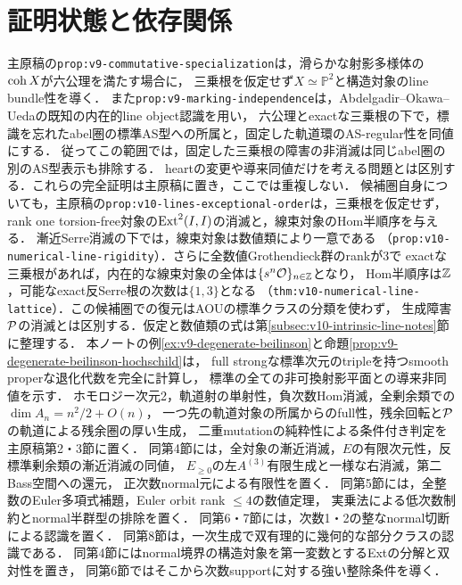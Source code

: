 \documentclass[11pt,a4paper]{ltjsarticle}
\begin{document}
\section{証明状態と依存関係}
\begin{description}[style=nextline]
\item[原稿に証明を収めた直接の結果]
主原稿の\texttt{prop:v9-commutative-specialization}は，滑らかな射影多様体の$\operatorname{coh} X$が六公理を満たす場合に，
三乗根を仮定せず$X\simeq\mathbb P^2$と構造対象のline bundle性を導く．
また\texttt{prop:v9-marking-independence}は，Abdelgadir--Okawa--Uedaの既知の内在的line object認識を用い，
六公理とexactな三乗根の下で，標識を忘れたabel圏の標準AS型への所属と，固定した軌道環のAS-regular性を同値にする．
従ってこの範囲では，固定した三乗根の障害の非消滅は同じabel圏の別のAS型表示も排除する．
heartの変更や導来同値だけを考える問題とは区別する．これらの完全証明は主原稿に置き，ここでは重複しない．
候補圏自身についても，主原稿の\texttt{prop:v10-lines-exceptional-order}は，三乗根を仮定せず，
rank one torsion-free対象の$\operatorname{Ext}^2(I,I)$の消滅と，線束対象のHom半順序を与える．
漸近Serre消滅の下では，線束対象は数値類により一意である
（\texttt{prop:v10-numerical-line-rigidity}）．さらに全数値Grothendieck群のrankが3で
exactな三乗根があれば，内在的な線束対象の全体は$\{s^n\mathcal O\}_{n\in\mathbb Z}$となり，
Hom半順序は$\mathbb Z$，可能なexact反Serre根の次数は$\{1,3\}$となる
（\texttt{thm:v10-numerical-line-lattice}）．この候補圏での復元はAOUの標準クラスの分類を使わず，
生成障害$\mathcal P$の消滅とは区別する．仮定と数値類の式は第\ref{subsec:v10-intrinsic-line-notes}節に整理する．
本ノートの例\ref{ex:v9-degenerate-beilinson}と命題\ref{prop:v9-degenerate-beilinson-hochschild}は，
full strongな標準次元のtripleを持つsmooth properな退化代数を完全に計算し，
標準の全ての非可換射影平面との導来非同値を示す．
ホモロジー次元2，軌道射の単射性，負次数Hom消滅，全剰余類での$\dim A_n=n^2/2+O(n)$，
一つ先の軌道対象の所属からのfull性，残余回転と$\mathcal P$の軌道による残余圏の厚い生成，
二重mutationの純粋性による条件付き判定を主原稿第2・3節に置く．
同第4節には，全対象の漸近消滅，$E$の有限次元性，反標準剰余類の漸近消滅の同値，
$E_{\geq0}$の左$A^{(3)}$有限生成と一様な右消滅，第二Bass空間への還元，
正次数normal元による有限性を置く．
同第5節には，全整数のEuler多項式補題，Euler orbit rank $\leq4$の数値定理，
実乗法による低次数制約とnormal半群型の排除を置く．
同第6・7節には，次数1・2の整なnormal切断による認識を置く．
同第8節は，一次生成で双有理的に幾何的な部分クラスの認識である．
同第4節にはnormal境界の構造対象を第一変数とするExtの分解と双対性を置き，
同第6節ではそこから次数supportに対する強い整除条件を導く．

\end{description}
\end{document}
